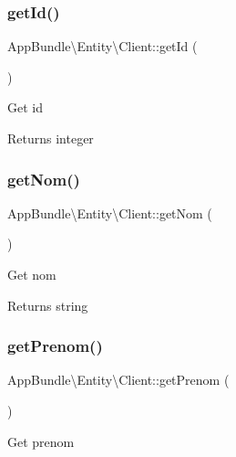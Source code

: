 \subsubsection{\texorpdfstring{get\+Id()}{getId()}}
{\footnotesize\ttfamily App\+Bundle\textbackslash{}\+Entity\textbackslash{}\+Client\+::get\+Id (\begin{DoxyParamCaption}{ }\end{DoxyParamCaption})}

Get id

\begin{DoxyReturn}{Returns}
integer 
\end{DoxyReturn}
\mbox{\label{class_app_bundle_1_1_entity_1_1_client_a6705d8eb6ed7a4a1cb35be05ccf1a6e4}} 
\subsubsection{\texorpdfstring{get\+Nom()}{getNom()}}
{\footnotesize\ttfamily App\+Bundle\textbackslash{}\+Entity\textbackslash{}\+Client\+::get\+Nom (\begin{DoxyParamCaption}{ }\end{DoxyParamCaption})}

Get nom

\begin{DoxyReturn}{Returns}
string 
\end{DoxyReturn}
\mbox{\label{class_app_bundle_1_1_entity_1_1_client_ad8dea1187e563bbe5cddbbe1ff7d792b}} 
\subsubsection{\texorpdfstring{get\+Prenom()}{getPrenom()}}
{\footnotesize\ttfamily App\+Bundle\textbackslash{}\+Entity\textbackslash{}\+Client\+::get\+Prenom (\begin{DoxyParamCaption}{ }\end{DoxyParamCaption})}

Get prenom

